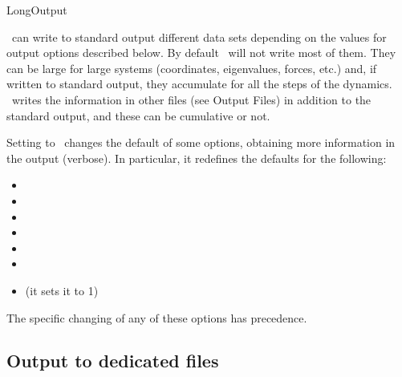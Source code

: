 \begin{fdflogicalF}{LongOutput}

  \siesta\ can write to standard output different data sets depending
  on the values for output options described below.  By default
  \siesta\ will not write most of them. They can be large for large
  systems (coordinates, eigenvalues, forces, etc.)  and, if written to
  standard output, they accumulate for all the steps of the
  dynamics. \siesta\ writes the information in other files (see Output
  Files) in addition to the standard output, and these can be
  cumulative or not.

  Setting  to \fdftrue\ changes the default of some
  options, obtaining more information in the output (verbose).  In
  particular, it redefines the defaults for the following:

  \begin{itemize}
    
    \item {}%
    
    \item {}%

    \item {}%

    \item {}%

    \item {}%
    
    \item {}%
    
    \item {}%
    (it sets it to 1)

  \end{itemize}

  The specific changing of any of these options has precedence.
  
\end{fdflogicalF}


\subsection{Output to dedicated files}%

